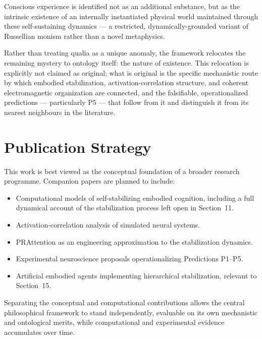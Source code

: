 \documentclass[11pt]{article}
\begin{document}
Conscious experience is identified not as an additional substance, but as the intrinsic existence of an internally instantiated physical world maintained through these self-sustaining dynamics --- a restricted, dynamically-grounded variant of Russellian monism rather than a novel metaphysics.

Rather than treating qualia as a unique anomaly, the framework relocates the remaining mystery to ontology itself: the nature of existence. This relocation is explicitly not claimed as original; what is original is the specific mechanistic route by which embodied stabilization, activation-correlation structure, and coherent electromagnetic organization are connected, and the falsifiable, operationalized predictions --- particularly P5 --- that follow from it and distinguish it from its nearest neighbours in the literature.

\section{Publication Strategy}

This work is best viewed as the conceptual foundation of a broader research programme. Companion papers are planned to include:
\begin{itemize}[nosep]
  \item Computational models of self-stabilizing embodied cognition, including a full dynamical account of the stabilization process left open in Section~11.
  \item Activation-correlation analysis of simulated neural systems.
  \item PRAttention as an engineering approximation to the stabilization dynamics.
  \item Experimental neuroscience proposals operationalizing Predictions P1--P5.
  \item Artificial embodied agents implementing hierarchical stabilization, relevant to Section~15.
\end{itemize}

Separating the conceptual and computational contributions allows the central philosophical framework to stand independently, evaluable on its own mechanistic and ontological merits, while computational and experimental evidence accumulates over time.
\end{document}
